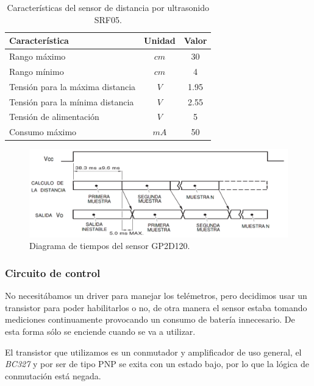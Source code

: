 \begin{table}[ht]
	\begin{center}
		\begin{tabular}{|l|c|c|}
			\hline
			Caracter\'istica & Unidad & Valor\\
			\hline
			Rango m\'aximo & $cm$ & 30 \\
			Rango m\'inimo & $cm$ & 4 \\
			Tensi\'on para la m\'axima distancia & $V$ & 1.95 \\
			Tensi\'on para la m\'inima distancia & $V$ & 2.55 \\
			Tensi\'on de alimentaci\'on & $V$ & 5 \\
			Consumo m\'aximo & $mA$ & 50 \\
			\hline
		\end{tabular}
	\end{center}
	\caption{Caracter\'isticas del sensor de distancia por ultrasonido SRF05.}
	\label{hT_gp2d120}
\end{table}

\begin{figure}[ht]
	\centering
	\includegraphics[scale=0.25]{figuras/gp2d120_pulse.png}
	\caption{Diagrama de tiempos del sensor GP2D120.}
	\label{hF_gp2d120_pulse}
\end{figure}

\subsubsection{Circuito de control}
\label{h_sensado_telemetros_circuito}

No necesit\'abamos un driver para manejar los tel\'emetros, pero decidimos usar un transistor para poder habilitarlos o no,
de otra manera el sensor estaba tomando mediciones continuamente provocando un consumo de bater\'ia innecesario.
De esta forma s\'olo se enciende cuando se va a utilizar.

El transistor que utilizamos es un conmutador y amplificador de uso general, el \emph{BC327} y por ser de tipo PNP se
exita con un estado bajo, por lo que la l\'ogica de conmutaci\'on est\'a negada.


